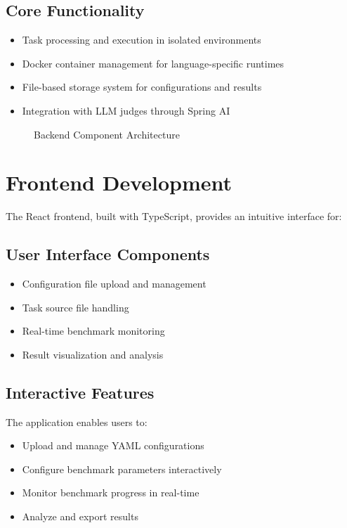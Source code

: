\subsection{Core Functionality}
\begin{itemize}
    \item Task processing and execution in isolated environments
    \item Docker container management for language-specific runtimes
    \item File-based storage system for configurations and results
    \item Integration with LLM judges through Spring AI
\end{itemize}

\begin{figure}[h]
    \centering
    \caption{Backend Component Architecture}
    \label{fig:backend-arch}
\end{figure}

\section{Frontend Development}

The React frontend, built with TypeScript, provides an intuitive interface for:

\subsection{User Interface Components}
\begin{itemize}
    \item Configuration file upload and management
    \item Task source file handling
    \item Real-time benchmark monitoring
    \item Result visualization and analysis
\end{itemize}

\subsection{Interactive Features}
The application enables users to:
\begin{itemize}
    \item Upload and manage YAML configurations
    \item Configure benchmark parameters interactively
    \item Monitor benchmark progress in real-time
    \item Analyze and export results
\end{itemize}

